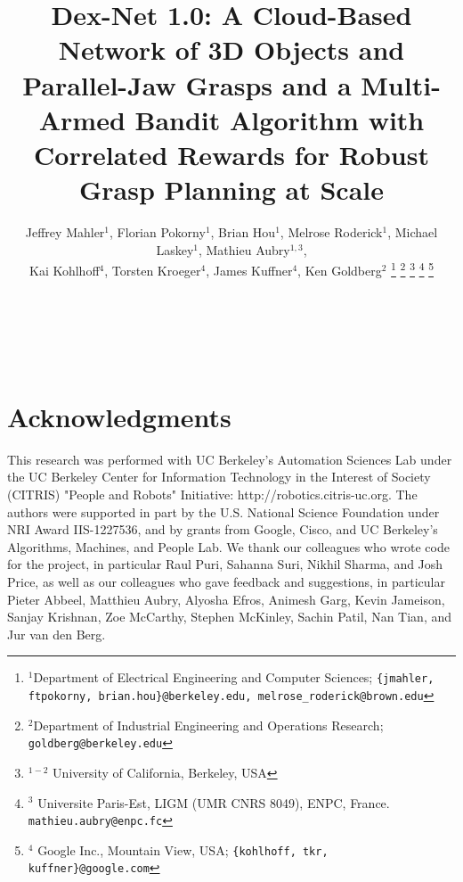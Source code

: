 \documentclass[letterpaper, 10 pt, conference]{ieeeconf}  %
\begin{document}
\title{\LARGE \bf Dex-Net 1.0: A Cloud-Based Network of 3D Objects and Parallel-Jaw Grasps and a Multi-Armed Bandit Algorithm with Correlated Rewards for Robust Grasp Planning at Scale
		}
\author{Jeffrey Mahler$^1$, Florian Pokorny$^1$, Brian Hou$^1$, Melrose Roderick$^1$, Michael Laskey$^1$, Mathieu Aubry$^{1,3}$, \\
Kai Kohlhoff$^4$, Torsten Kroeger$^4$, James Kuffner$^4$, Ken Goldberg$^2$
\thanks{$^1$Department of Electrical Engineering and Computer Sciences; {\tt\small \{jmahler, ftpokorny, brian.hou\}@berkeley.edu, melrose\_roderick@brown.edu}}%
\thanks{$^2$Department of Industrial Engineering and Operations Research; {\tt\small goldberg@berkeley.edu}}%
\thanks{$^{1-2}$ University of California, Berkeley, USA}%
\thanks{$^3$ Universite Paris-Est, LIGM (UMR CNRS 8049), ENPC, France. {\tt\small mathieu.aubry@enpc.fc}}%
\thanks{$^4$ Google Inc., Mountain View, USA; {\tt\small \{kohlhoff, tkr, kuffner\}@google.com}}
}
\maketitle

 \\
 \\

%


%


%




%

\section{Acknowledgments}
This research was performed with UC Berkeley's Automation Sciences Lab under the UC Berkeley Center for Information Technology in the Interest of Society (CITRIS) "People and Robots" Initiative: http://robotics.citris-uc.org.
The authors were supported in part by the U.S. National Science Foundation under NRI Award IIS-1227536, and by grants from Google, Cisco, and UC Berkeley's Algorithms, Machines, and People Lab.
We thank our colleagues who wrote code for the project, in particular Raul Puri, Sahanna Suri, Nikhil Sharma, and Josh Price, as well as our colleagues who gave feedback and suggestions, in particular Pieter Abbeel, Matthieu Aubry, Alyosha Efros, Animesh Garg, Kevin Jameison, Sanjay Krishnan, Zoe McCarthy, Stephen McKinley, Sachin Patil, Nan Tian, and Jur van den Berg.



\end{document}
